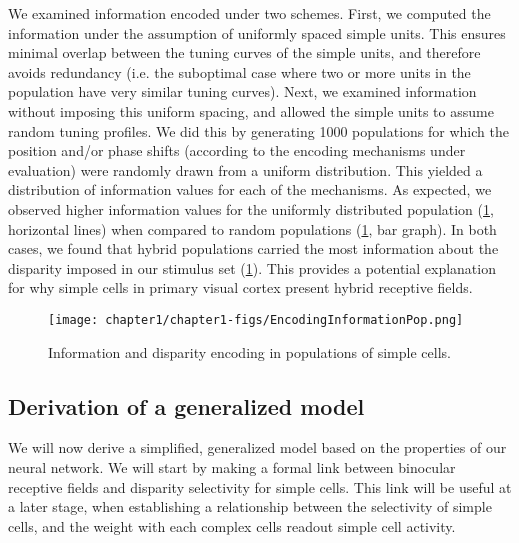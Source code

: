We examined information encoded under two schemes. First, we computed the information under the assumption of uniformly spaced simple units. This ensures minimal overlap between the tuning curves of the simple units, and therefore avoids redundancy (i.e. the suboptimal case where two or more units in the population have very similar tuning curves). Next, we examined information without imposing this uniform spacing, and allowed the simple units to assume random tuning profiles. We did this by generating 1000 populations for which the position and/or phase shifts (according to the encoding mechanisms under evaluation) were randomly drawn from a uniform distribution. This yielded a distribution of information values for each of the mechanisms. As expected, we observed higher information values for the uniformly distributed population (\ref{fig:DispEncPop}, horizontal lines) when compared to random populations (\ref{fig:DispEncPop}, bar graph). In both cases, we found that hybrid populations carried the most information about the disparity imposed in our stimulus set (\ref{fig:DispEncPop}). This provides a potential explanation for why simple cells in primary visual cortex present hybrid receptive fields.

\begin{figure}
  \centering
  \texttt{[image: chapter1/chapter1-figs/EncodingInformationPop.png]}
  \caption[Information and disparity encoding in populations of simple cells.]{Information and disparity encoding in populations of simple cells.}
  \label{fig:DispEncPop}
\end{figure}

\subsection{Derivation of a generalized model}

We will now derive a simplified, generalized model based on the properties of our neural network. We will start by making a formal link between binocular receptive fields and disparity selectivity for simple cells. This link will be useful at a later stage, when establishing a relationship between the selectivity of simple cells, and the weight with each complex cells readout simple cell activity.

